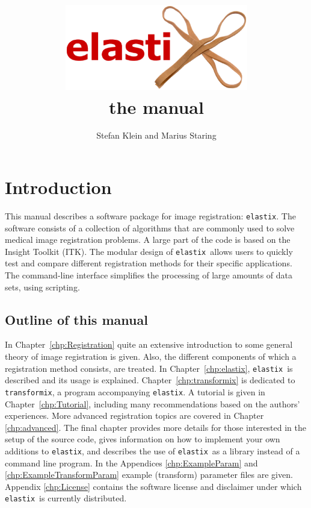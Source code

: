 \documentclass[]{report}
\newcommand{\elastix}{\texttt{elastix}}
\newcommand{\transformix}{\texttt{transformix}}
\begin{document}
\title{\includegraphics[width=8cm]{elastixLogo.eps}\\\vspace{1cm}the manual\vspace{1cm}}
\author{Stefan Klein and Marius Staring}
\maketitle

\setcounter{page}{1}  \tableofcontents
\newpage
{} \setcounter{page}{1}


\chapter{Introduction}\label{chp:Introduction}

This manual describes a software package for image registration:
\elastix. The software consists of a collection of algorithms that
are commonly used to solve medical image registration problems. A
large part of the code is based on the Insight Toolkit (ITK). The
modular design of \elastix\ allows users to quickly test and
compare different registration methods for their specific
applications. The command-line interface simplifies the processing
of large amounts of data sets, using scripting.

\section{Outline of this manual}

In Chapter~\ref{chp:Registration} quite an extensive introduction to
some general theory of image registration is given. Also, the
different components of which a registration method consists, are
treated. In Chapter~\ref{chp:elastix}, \elastix\ is described and
its usage is explained. Chapter~\ref{chp:transformix} is dedicated
to \transformix, a program accompanying \elastix. A tutorial is
given in Chapter~\ref{chp:Tutorial}, including many recommendations
based on the authors' experiences. More advanced registration topics
are covered in Chapter \ref{chp:advanced}. The final chapter
provides more details for those interested in the setup of the
source code, gives information on how to implement your own
additions to \elastix, and describes the use of \elastix\ as a
library instead of a command line program. In the Appendices
\ref{chp:ExampleParam} and \ref{chp:ExampleTransformParam} example
(transform) parameter files are given. Appendix \ref{chp:License}
contains the software license and disclaimer under which \elastix\
is currently distributed.
\end{document}

